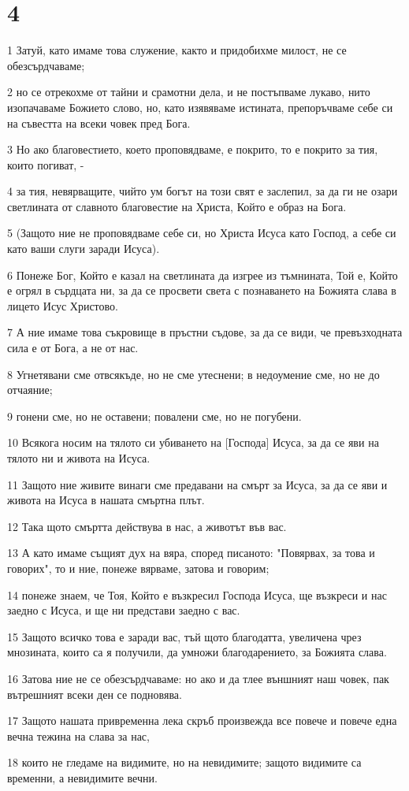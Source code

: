 \chapter{4}

\par 1 Затуй, като имаме това служение, както и придобихме милост, не се обезсърдчаваме;
\par 2 но се отрекохме от тайни и срамотни дела, и не постъпваме лукаво, нито изопачаваме Божието слово, но, като изявяваме истината, препоръчваме себе си на съвестта на всеки човек пред Бога.
\par 3 Но ако благовестието, което проповядваме, е покрито, то е покрито за тия, които погиват, -
\par 4 за тия, невярващите, чийто ум богът на този свят е заслепил, за да ги не озари светлината от славното благовестие на Христа, Който е образ на Бога.
\par 5 (Защото ние не проповядваме себе си, но Христа Исуса като Господ, а себе си като ваши слуги заради Исуса).
\par 6 Понеже Бог, Който е казал на светлината да изгрее из тъмнината, Той е, Който е огрял в сърдцата ни, за да се просвети света с познаването на Божията слава в лицето Исус Христово.
\par 7 А ние имаме това съкровище в пръстни съдове, за да се види, че превъзходната сила е от Бога, а не от нас.
\par 8 Угнетявани сме отвсякъде, но не сме утеснени; в недоумение сме, но не до отчаяние;
\par 9 гонени сме, но не оставени; повалени сме, но не погубени.
\par 10 Всякога носим на тялото си убиването на [Господа] Исуса, за да се яви на тялото ни и живота на Исуса.
\par 11 Защото ние живите винаги сме предавани на смърт за Исуса, за да се яви и живота на Исуса в нашата смъртна плът.
\par 12 Така щото смъртта действува в нас, а животът във вас.
\par 13 А като имаме същият дух на вяра, според писаното: "Повярвах, за това и говорих", то и ние, понеже вярваме, затова и говорим;
\par 14 понеже знаем, че Тоя, Който е възкресил Господа Исуса, ще възкреси и нас заедно с Исуса, и ще ни представи заедно с вас.
\par 15 Защото всичко това е заради вас, тъй щото благодатта, увеличена чрез мнозината, които са я получили, да умножи благодарението, за Божията слава.
\par 16 Затова ние не се обезсърдчаваме: но ако и да тлее външният наш човек, пак вътрешният всеки ден се подновява.
\par 17 Защото нашата привременна лека скръб произвежда все повече и повече една вечна тежина на слава за нас,
\par 18 които не гледаме на видимите, но на невидимите; защото видимите са временни, а невидимите вечни.

